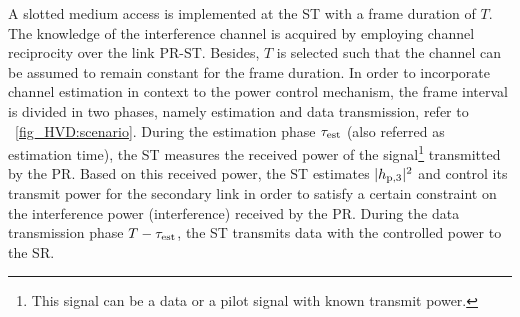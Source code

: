 A slotted medium access is implemented at the ST with a frame duration of $T$. The knowledge of the interference channel is acquired by employing channel reciprocity over the link PR-ST. Besides, $T$ is selected such that the channel can be assumed to remain constant for the frame duration. %
In order to incorporate channel estimation in context to the power control mechanism, the frame interval is divided in two phases, namely estimation and data transmission, refer to \figurename~\ref{fig_HVD:scenario}. During the estimation phase $\tau_{\text{est}}$ (also referred as estimation time), the ST measures the received power of the signal\footnote{This signal can be a data or a pilot signal with known transmit power.} transmitted by the PR. Based on this received power, the ST estimates $|h_{\text{p,3}}|^2$ and control its transmit power for the secondary link in order to satisfy a certain constraint on the interference power (interference) received by the PR. During the data transmission phase $T-\tau_{\text{est}}$, the ST transmits data with the controlled power to the SR.

